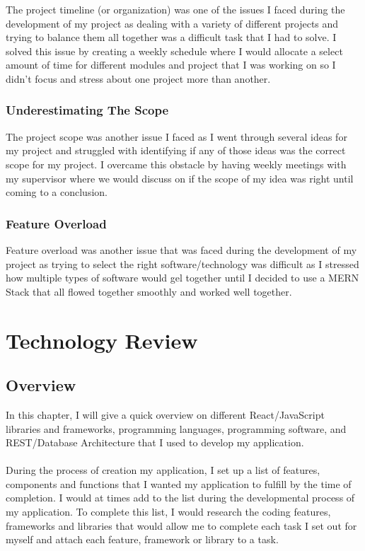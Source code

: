 The project timeline (or organization) was one of the issues I faced during the development of my project as dealing with a variety of different projects and trying to balance them all together was a difficult task that I had to solve. I solved this issue by creating a weekly schedule where I would allocate a select amount of time for different modules and project that I was working on so I didn't focus and stress about one project more than another.

\subsection{Underestimating The Scope}

The project scope was another issue I faced as I went through several ideas for my project and struggled with identifying if any of those ideas was the correct scope for my project. I overcame this obstacle by having weekly meetings with my supervisor where we would discuss on if the scope of my idea was right until coming to a conclusion.

\subsection{Feature Overload}

Feature overload was another issue that was faced during the development of my project as trying to select the right software/technology was difficult as I stressed how multiple types of software would gel together until I decided to use a MERN Stack that all flowed together smoothly and worked well together.

\chapter{Technology Review}

\section{Overview}

In this chapter, I will give a quick overview on different React/JavaScript libraries and frameworks, programming languages, programming software, and REST/Database Architecture that I used to develop my application.\\ \\
During the process of creation my application, I set up a list of features, components and functions that I wanted my application to fulfill by the time of completion. I would at times add to the list during the developmental process of my application. To complete this list, I would research the coding features, frameworks and libraries that would allow me to complete each task I set out for myself and attach each feature, framework or library to a task.

